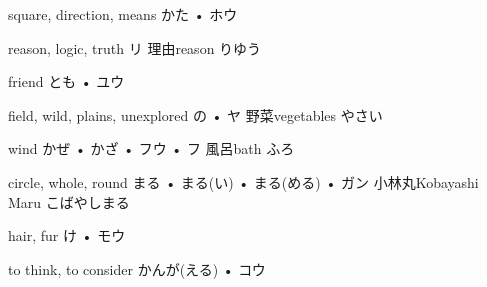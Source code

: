 



\setcounter{cardnum}{145}

		{square, direction, means}
		{かた • ホウ}
		{}{}
		{}{}
		{}{}
		{}{}
		{}{}

		{reason, logic, truth}
		{リ}
		{理由}{reason りゆう}
		{}{}
		{}{}
		{}{}
		{}{}

		{friend}
		{とも • ユウ}
		{}{}
		{}{}
		{}{}
		{}{}
		{}{}

		{field, wild, plains, unexplored}
		{の • ヤ}
		{野菜}{vegetables やさい}
		{}{}
		{}{}
		{}{}
		{}{}

		{wind}
		{かぜ • かざ • フウ • フ}
		{風呂}{bath ふろ}
		{}{}
		{}{}
		{}{}
		{}{}

		{circle, whole, round}
		{まる • まる(い) • まる(める) • ガン}
		{小林丸}{Kobayashi Maru こばやしまる}
		{}{}
		{}{}
		{}{}
		{}{}

		{hair, fur}
		{け • モウ}
		{}{}
		{}{}
		{}{}
		{}{}
		{}{}

		{to think, to consider}
		{かんが(える) • コウ}
		{}{}
		{}{}
		{}{}
		{}{}
		{}{}

